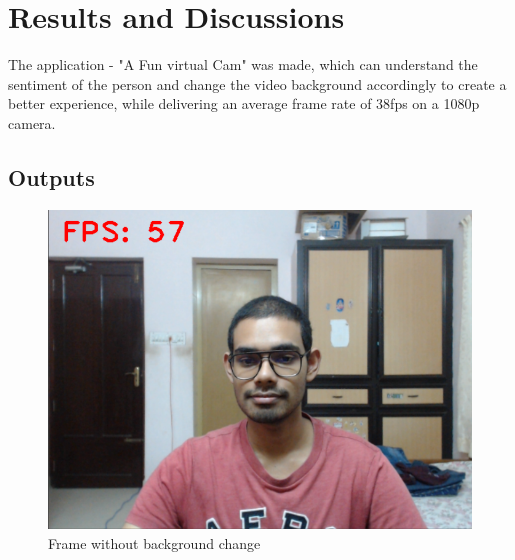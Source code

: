 
\chapter{Results and Discussions} %

\label{ChapterX} %



The application - "A Fun virtual Cam" was made, which can understand the sentiment of the person and change the video background accordingly to create a better experience, while delivering an average frame rate of 38fps on a 1080p camera.

\section{Outputs}
\begin{figure}[H]
\centering
\includegraphics[width = .8\textwidth]{Images/DesProOutput1}
\caption{Frame without background change}
\label{List of organizations}
\end{figure}

